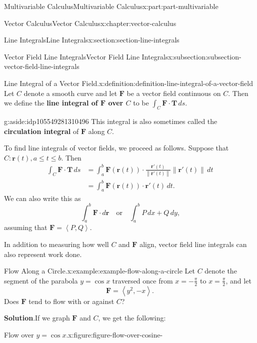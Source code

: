 \documentclass[twoside,10pt,]{book}
\newcommand{\blocktitlefont}{\relax}
\newcommand{\terminology}[1]{\textbf{#1}}
\numberwithin{equation}{part}
\newcommand{\vb}[1]{\mathbf{#1}}
\newcommand{\norm}[1]{\left\| #1 \right\|}
\newcommand{\dotprod}[1]{\left\langle #1 \right\rangle}
\newcommand{\qq}[1]{\quad\text{#1}\quad}
\newcommand{\amp}{&}
\begin{document}
\begin{partptx}{Multivariable Calculus}{}{Multivariable Calculus}{}{}{x:part:part-multivariable}
\begin{chapterptx}{Vector Calculus}{}{Vector Calculus}{}{}{x:chapter:vector-calculus}
\begin{sectionptx}{Line Integrals}{}{Line Integrals}{}{}{x:section:section-line-integrals}
\begin{subsectionptx}{Vector Field Line Integrals}{}{Vector Field Line Integrals}{}{}{x:subsection:subsection-vector-field-line-integrals}
\begin{definition}{Line Integral of a Vector Field.}{x:definition:definition-line-integral-of-a-vector-field}%
%
Let \(C\) denote a smooth curve and let \(\vb{F}\) be a vector field continuous on \(C\). Then we define the \terminology{line integral of \(\vb{F}\) over \(C\)} to be \(\int_{C}\vb{F}\cdot\vb{T}\,ds\).%
\begin{aside}{}{g:aside:idp105549281310496}%
This integral is also sometimes called the \terminology{circulation integral} of \(\vb{F}\) along \(C\).%
\end{aside}
\end{definition}
To find line integrals of vector fields, we proceed as follows. Suppose that \(C:\vb{r}(t), a\leq t\leq b\). Then%
\begin{align*}
\int_{C}\vb{F}\cdot\vb{T}\,ds \amp = \int_{a}^{b}\vb{F}(\vb{r}(t))\cdot\frac{\vb{r}'(t)}{\norm{\vb{r}'(t)}}\norm{\vb{r}'(t)}\,dt \\
\amp = \int_{a}^{b}\vb{F}(\vb{r}(t))\cdot\vb{r}'(t)\,dt \text{.}
\end{align*}
We can also write this as%
\begin{equation*}
\int_{a}^{b}\vb{F}\cdot d\vb{r} \qq{or} \int_{a}^{b} P\,dx + Q\,dy\text{,}
\end{equation*}
assuming that \(\vb{F} = \dotprod{P,Q}\).%
\par
In addition to measuring how well \(C\) and \(\vb{F}\) align, vector field line integrals can also represent work done.%
\begin{example}{Flow Along a Circle.}{x:example:example-flow-along-a-circle}%
Let \(C\) denote the segment of the parabola \(y = \cos x\) traversed once from \(x = -\frac{\pi}{2}\) to \(x = \frac{\pi}{2}\), and let%
\begin{equation*}
\vb{F} = \dotprod{y^{2}, -x}\text{.}
\end{equation*}
Does \(\vb{F}\) tend to flow with or against \(C\)?%
\par\smallskip%
\noindent\textbf{\blocktitlefont Solution}.\hypertarget{g:solution:idp105549281318816}{}\quad{}If we graph \(\vb{F}\) and \(C\), we get the following: \begin{figureptx}{Flow over \(y = \cos x\).}{x:figure:figure-flow-over-cosine-}{}%
\begin{image}{0}{1}{0}%

\end{image}
\end{figureptx}
\end{example}
\end{subsectionptx}
\end{sectionptx}
\end{chapterptx}
\end{partptx}
\end{document}
